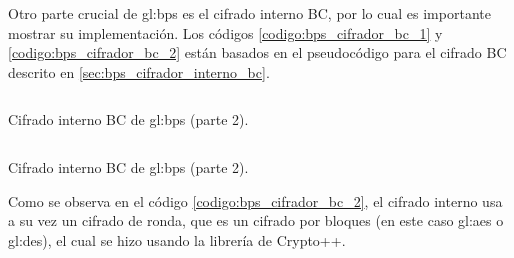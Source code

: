 Otro parte crucial de \gls{gl:bps} es el cifrado interno BC, por lo cual es
importante mostrar su implementación. Los códigos \ref{codigo:bps_cifrador_bc_1}
y \ref{codigo:bps_cifrador_bc_2} están basados en el pseudocódigo para el
cifrado BC descrito en \ref{sec:bps_cifrador_interno_bc}.

\begin{listing}
  \inputminted[firstline=111, lastline=165]
    {c++}{../implementaciones/bps/cifrador_BC.cpp}
  \caption{Cifrado interno BC de  \gls{gl:bps} (parte 2).}
  \label{codigo:bps_cifrador_bc_1}
\end{listing}

\begin{listing}
  \inputminted[firstline=165, lastline=218]
    {c++}{../implementaciones/bps/cifrador_BC.cpp}
  \caption{Cifrado interno BC de  \gls{gl:bps} (parte 2).}
  \label{codigo:bps_cifrador_bc_2}
\end{listing}

Como se observa en el código \ref{codigo:bps_cifrador_bc_2}, el cifrado
interno usa a su vez un cifrado de ronda, que es un cifrado por bloques
(en este caso \gls{gl:aes} o \gls{gl:des}), el cual se hizo usando la
librería de Crypto++.
